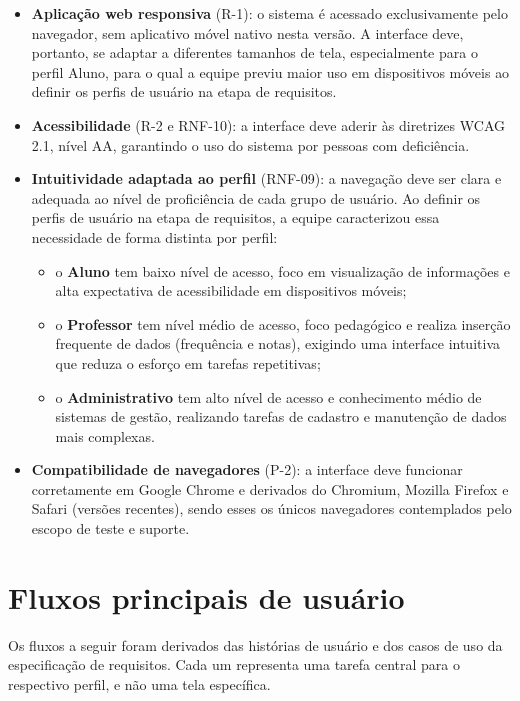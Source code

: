 \begin{itemize}
    \item \textbf{Aplicação web responsiva} (R-1): o sistema é acessado
    exclusivamente pelo navegador, sem aplicativo móvel nativo nesta versão.
    A interface deve, portanto, se adaptar a diferentes tamanhos de tela,
    especialmente para o perfil Aluno, para o qual a equipe previu maior
    uso em dispositivos móveis ao definir os perfis de usuário na etapa de
    requisitos.
    \item \textbf{Acessibilidade} (R-2 e RNF-10): a interface deve aderir às
    diretrizes WCAG 2.1, nível AA, garantindo o uso do sistema por pessoas com
    deficiência.
    \item \textbf{Intuitividade adaptada ao perfil} (RNF-09): a navegação deve
    ser clara e adequada ao nível de proficiência de cada grupo de usuário.
    Ao definir os perfis de usuário na etapa de requisitos, a equipe
    caracterizou essa necessidade de forma distinta por perfil:
    \begin{itemize}
        \item o \textbf{Aluno} tem baixo nível de acesso, foco em
        visualização de informações e alta expectativa de acessibilidade em
        dispositivos móveis;
        \item o \textbf{Professor} tem nível médio de acesso, foco pedagógico
        e realiza inserção frequente de dados (frequência e notas), exigindo
        uma interface intuitiva que reduza o esforço em tarefas repetitivas;
        \item o \textbf{Administrativo} tem alto nível de acesso e
        conhecimento médio de sistemas de gestão, realizando tarefas de
        cadastro e manutenção de dados mais complexas.
    \end{itemize}
    \item \textbf{Compatibilidade de navegadores} (P-2): a interface deve
    funcionar corretamente em Google Chrome e derivados do Chromium, Mozilla
    Firefox e Safari (versões recentes), sendo esses os únicos navegadores
    contemplados pelo escopo de teste e suporte.
\end{itemize}

\section{Fluxos principais de usuário}

Os fluxos a seguir foram derivados das histórias de usuário e dos casos de
uso da especificação de requisitos. Cada um representa uma tarefa central
para o respectivo perfil, e não uma tela específica.

